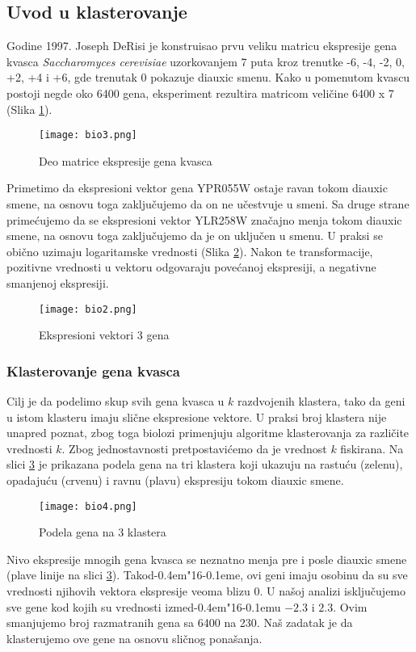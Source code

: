 \documentclass[a4paper]{book}
\def \dj {d\kern-0.4em\char"16\kern-0.1em}
\begin{document}
\subsection{Uvod u klasterovanje}
Godine 1997. Joseph DeRisi je konstruisao prvu veliku matricu ekspresije gena kvasca \textit{Saccharomyces cerevisiae} uzorkovanjem 7 puta kroz trenutke -6, -4, -2, 0, +2, +4 i +6, gde trenutak 0 pokazuje diauxic smenu. Kako u pomenutom kvascu postoji negde oko 6400 gena, eksperiment rezultira matricom veličine 6400 x 7 (Slika \ref{slika 2}). 
\begin{figure}[h]
    \centering
    \texttt{[image: bio3.png]}
    \caption{Deo matrice ekspresije gena kvasca}
    \label{slika 2}
\end{figure}

Primetimo da ekspresioni vektor gena YPR055W ostaje ravan tokom diauxic smene, na osnovu toga zaključujemo da on ne učestvuje u smeni. Sa druge strane primećujemo da se ekspresioni vektor YLR258W značajno menja tokom diauxic smene, na osnovu toga zaključujemo da je on uključen u smenu. U praksi se obično uzimaju logaritamske vrednosti (Slika \ref{slika 3}). Nakon te transformacije, pozitivne vrednosti u vektoru odgovaraju povećanoj ekspresiji, a negativne smanjenoj ekspresiji.
\begin{figure}[h]
    \centering
    \texttt{[image: bio2.png]}
    \caption{Ekspresioni vektori 3 gena}
    \label{slika 3}
\end{figure}

\subsubsection{Klasterovanje gena kvasca}
Cilj je da podelimo skup svih gena kvasca u $k$ razdvojenih klastera, tako da geni u istom klasteru imaju slične ekspresione vektore. U praksi broj klastera nije unapred poznat, zbog toga biolozi primenjuju algoritme klasterovanja za različite vrednosti $k$. Zbog jednostavnosti pretpostavićemo da je vrednost $k$ fiskirana. Na slici \ref{slika 4} je prikazana podela gena na tri klastera koji ukazuju na rastuću (zelenu), opadajuću (crvenu) i ravnu (plavu) ekspresiju tokom diauxic smene.
\begin{figure}[h]
    \centering
    \texttt{[image: bio4.png]}
    \caption{Podela gena na 3 klastera}
    \label{slika 4}
\end{figure}

Nivo ekspresije mnogih gena kvasca se neznatno menja pre i posle diauxic smene (plave linije na slici \ref{slika 4}). Tako\dj e, ovi geni imaju osobinu da su sve vrednosti njihovih vektora ekspresije veoma blizu $0$. U našoj analizi isključujemo sve gene kod kojih su vrednosti izme\dj u $-2.3$ i $2.3$. Ovim smanjujemo broj razmatranih gena sa 6400 na 230. Naš zadatak je da klasterujemo ove gene na osnovu sličnog ponašanja.
\end{document}
